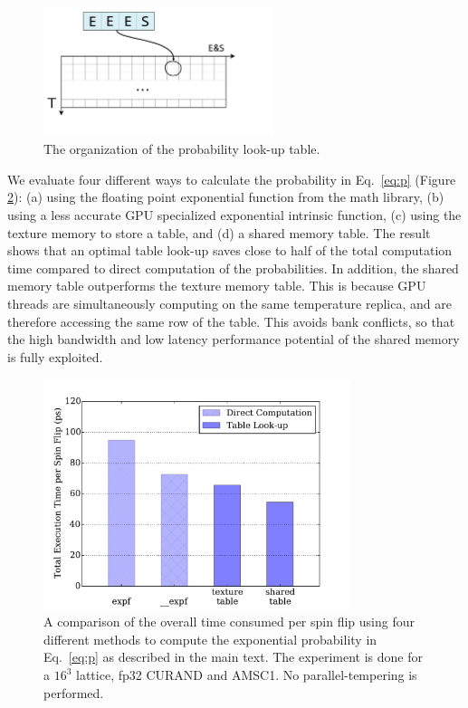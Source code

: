 \begin{figure}[!h]
  \centering
  \includegraphics[width=0.6\textwidth]{img/table1.pdf}
  \caption{The organization of the probability look-up table.}
\label{fig_table}
\end{figure}

We evaluate four different ways to calculate the probability in Eq.~\ref{eq:p} (Figure \ref{fig_perf_prob}): 
(a) using the floating point exponential function from the math library, 
(b) using a less accurate GPU specialized exponential intrinsic function, 
(c) using the texture memory to store a table, and 
(d) a shared memory table. 
The result shows that an optimal table look-up saves close to half of the total computation time
compared to direct computation of the probabilities. In addition, 
the shared memory table outperforms the texture memory table. This is
because GPU threads are simultaneously computing on the same
temperature replica, and are therefore accessing the same row of the
table. This avoids bank conflicts, so that the high bandwidth and low
latency performance potential of the shared memory is fully exploited. 


\begin{figure}[!h]
  \centering
  \includegraphics[width=0.8\textwidth]{img/prob1.pdf}
  \caption{A comparison of the overall time consumed per spin flip 
using four different methods to compute the exponential probability in 
Eq.~\ref{eq:p} as described in the main text. 
The experiment is done for a $16^3$ lattice, fp32 CURAND and AMSC1. 
  No parallel-tempering is performed.}
  \label{fig_perf_prob}
\end{figure}


